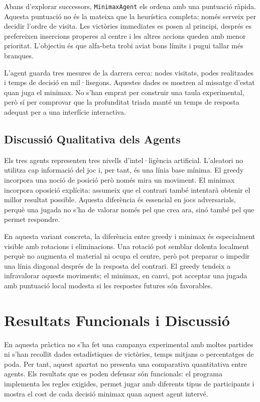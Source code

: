 \documentclass[conference,compsoc]{IEEEtran}
\begin{document}
Abans d'explorar successors, \texttt{MinimaxAgent} els ordena amb una puntuació
ràpida. Aquesta puntuació no és la mateixa que la heurística completa: només serveix
per decidir l'ordre de visita. Les victòries immediates es posen al principi,
després es prefereixen insercions properes al centre i les altres accions queden
amb menor prioritat. L'objectiu és que alfa-beta trobi aviat bons límits i pugui
tallar més branques.

L'agent guarda tres mesures de la darrera cerca: nodes visitats, podes realitzades
i temps de decisió en mil·lisegons. Aquestes dades es mostren al missatge d'estat
quan juga el minimax. No s'han emprat per construir una taula experimental, però
sí per comprovar que la profunditat triada manté un temps de resposta adequat per
a una interfície interactiva.

\subsection{Discussió Qualitativa dels Agents}

Els tres agents representen tres nivells d'intel·ligència artificial. L'aleatori
no utilitza cap informació del joc i, per tant, és una línia base mínima. El
greedy incorpora una noció de posició però només mira un moviment. El minimax
incorpora oposició explícita: assumeix que el contrari també intentarà obtenir el
millor resultat possible. Aquesta diferència és essencial en jocs adversarials,
perquè una jugada no s'ha de valorar només pel que crea ara, sinó també pel que
permet respondre.

En aquesta variant concreta, la diferència entre greedy i minimax és especialment
visible amb rotacions i eliminacions. Una rotació pot semblar dolenta localment
perquè no augmenta el material ni ocupa el centre, però pot preparar o impedir una
línia diagonal després de la resposta del contrari. El greedy tendeix a infravalorar
aquests moviments; el minimax, en canvi, pot acceptar una jugada amb puntuació
local modesta si les respostes futures són favorables.

\section{Resultats Funcionals i Discussió}
\label{sec:resultats}

En aquesta pràctica no s'ha fet una campanya experimental amb moltes partides ni
s'han recollit dades estadístiques de victòries, temps mitjans o percentatges de
poda. Per tant, aquest apartat no presenta una comparativa quantitativa entre
agents. Els resultats que es poden defensar són funcionals: el programa implementa
les regles exigides, permet jugar amb diferents tipus de participants i mostra el
cost de cada decisió minimax quan aquest agent intervé.
\end{document}
